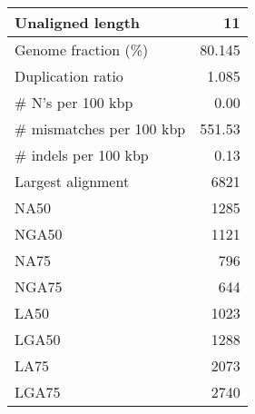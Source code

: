 \documentclass[12pt,a4paper]{article}
\begin{document}
\begin{table}[ht]
\begin{center}
\begin{tabular}{|l*{1}{|r}|}
Unaligned length & 11 \\ \hline
Genome fraction (\%) & 80.145 \\ \hline
Duplication ratio & 1.085 \\ \hline
\# N's per 100 kbp & 0.00 \\ \hline
\# mismatches per 100 kbp & 551.53 \\ \hline
\# indels per 100 kbp & 0.13 \\ \hline
Largest alignment & 6821 \\ \hline
NA50 & 1285 \\ \hline
NGA50 & 1121 \\ \hline
NA75 & 796 \\ \hline
NGA75 & 644 \\ \hline
LA50 & 1023 \\ \hline
LGA50 & 1288 \\ \hline
LA75 & 2073 \\ \hline
LGA75 & 2740 \\ \hline
\end{tabular}
\end{center}
\end{table}
\end{document}
